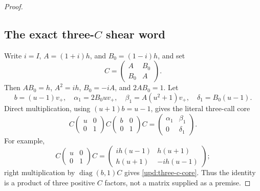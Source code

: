 \begin{proof}
\subsection[The exact three-C shear word]{The exact three-$C$ shear word}
\label{upd:three-c}

Write $i=I$, $A=(1+i)h$, and $B_0=(1-i)h$, and set
\[
  C=\begin{pmatrix}A&B_0\\ B_0&A\end{pmatrix}.
\]
Then $A B_0=h$, $A^2=ih$, $B_0=-iA$, and $2AB_0=1$.  Let
\[
  b=(u-1)v_+,
  \quad \alpha_1=2B_0uv_+,
  \quad \beta_1=A(u^2+1)v_+,
  \quad \delta_1=B_0(u-1).
\]
Direct multiplication, using $(u+1)b=u-1$, gives the literal three-call
core
\begin{equation}
\label{upd:three-c-core}
  C\begin{pmatrix}u&0\\0&1\end{pmatrix}
   C\begin{pmatrix}b&0\\0&1\end{pmatrix}C
    =\begin{pmatrix}\alpha_1&\beta_1\\0&\delta_1\end{pmatrix}.
\end{equation}
For example,
\[
  C\begin{pmatrix}u&0\\0&1\end{pmatrix}C
   =\begin{pmatrix}ih(u-1)&h(u+1)\\
                     h(u+1)&-ih(u-1)\end{pmatrix};
\]
right multiplication by $\operatorname{diag}(b,1)C$ gives
\eqref{upd:three-c-core}.  Thus the identity is a product of three
positive $C$ factors, not a matrix supplied as a premise.


\end{proof}
